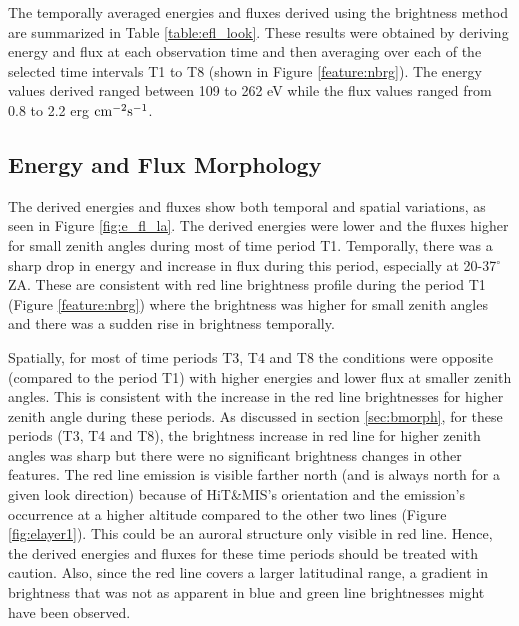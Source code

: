 \documentclass[crop=false,class=mitthesis,oneside,font=12pt]{standalone}
\begin{document}
The temporally averaged energies and fluxes derived using the brightness method are summarized in Table \ref{table:efl_look}. These results were obtained by deriving energy and flux at each observation time and then averaging over each of the selected time intervals T1 to T8 (shown in Figure \ref{feature:nbrg}). The energy values derived ranged between 109 to 262 eV while the flux values ranged from 0.8 to 2.2 erg $\rm cm^{-2} s^{-1}$.


\subsection{Energy and Flux Morphology}
\label{sec:emorph}
The derived energies and fluxes show both temporal and spatial variations, as seen in Figure \ref{fig:e_fl_la}. The derived energies were lower and the fluxes higher for small zenith angles during most of time period T1. Temporally, there was a sharp drop in energy and increase in flux during this period, especially at 20-37$^\circ$ ZA. These are consistent with red line brightness profile during the period T1 (Figure \ref{feature:nbrg}) where the brightness was higher for small zenith angles and there was a sudden rise in brightness temporally.

Spatially, for most of time periods T3, T4 and T8 the conditions were opposite (compared to the period T1) with higher energies and lower flux at smaller zenith angles. This is consistent with the increase in the red line brightnesses for higher zenith angle during these periods. As discussed in section \ref{sec:bmorph}, for these periods (T3, T4 and T8), the brightness increase in red line for higher zenith angles was sharp but there were no significant brightness changes in other features. The red line emission is visible farther north (and is always north for a given look direction) because of HiT\&MIS's orientation and the emission's occurrence at a higher altitude compared to the other two lines (Figure \ref{fig:elayer1}). This could be an auroral structure only visible in red line. Hence, the derived energies and fluxes for these time periods should be treated with caution. Also, since the red line covers a larger latitudinal range, a gradient in brightness that was not as apparent in blue and green line brightnesses might have been observed. 
\end{document}
